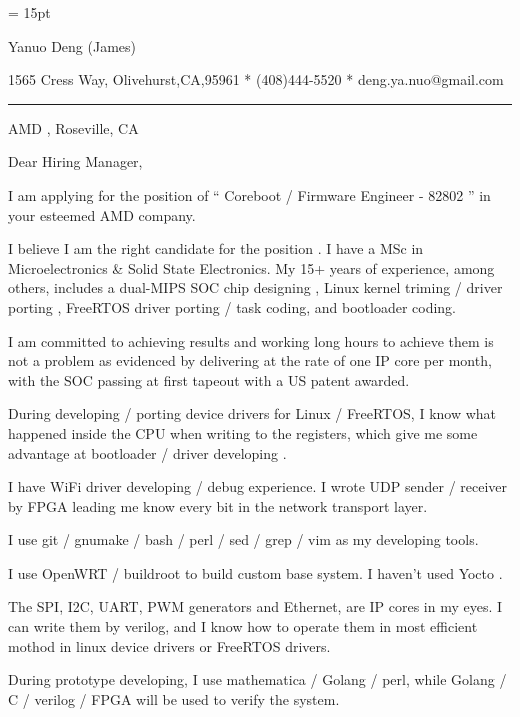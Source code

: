 

  \FFrg \baselineskip = 15pt

{
Yanuo Deng (James)
}

{ 
1565 Cress Way, Olivehurst,CA,95961
*
(408)444-5520
*
deng.ya.nuo@gmail.com
}

{ \smallbreak } 

{\par\noindent\hrule} 

{ \bigbreak } 




AMD , Roseville, CA

{ \bigbreak } 
{ 
Dear Hiring Manager,
}

{ \bigbreak } 
I am applying for the position of `` Coreboot / Firmware Engineer - 82802 '' in your esteemed AMD company.

{ \bigbreak } 
I believe I am the right candidate for the position .
I have a MSc in Microelectronics \& Solid State Electronics.
My 15+ years of experience, among others, 
includes a dual-MIPS SOC chip designing ,
Linux kernel triming  /  driver porting , 
FreeRTOS driver porting  /  task coding,
and bootloader coding.

{ \bigbreak } 
I am committed to achieving results and working long hours 
to achieve them is not a problem as evidenced by 
delivering at the rate of one IP core per month,
with the SOC passing at first tapeout
with a US patent awarded.

{ \bigbreak } 
During developing  /  porting device drivers for Linux / FreeRTOS,
I know what happened inside the CPU when writing to the registers,
which give me some advantage at bootloader  /  driver developing .

{ \bigbreak } 
I have WiFi driver developing / debug experience. 
I wrote UDP sender / receiver by FPGA leading me know every bit in the network transport layer.

{ \bigbreak } 
I use git  /  gnumake  /  bash  /  perl  /  sed  /  grep  /  vim as my developing tools.

{ \bigbreak } 
I use OpenWRT / buildroot to build custom base system. I haven't used Yocto .

{ \bigbreak } 
The SPI, I2C, UART, PWM generators and Ethernet, are IP cores in my eyes.
I can write them by verilog, 
and I know how to operate them in most efficient mothod
in linux device drivers or FreeRTOS drivers.

{ \bigbreak } 
During prototype developing, I use mathematica / Golang / perl, 
while Golang / C / verilog / FPGA will be used to verify the system.

